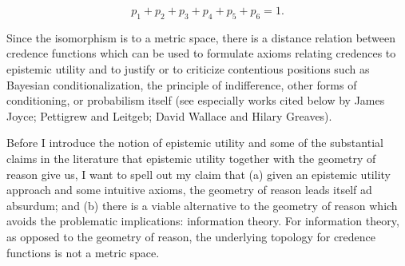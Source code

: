 \documentclass[11pt]{article}
\begin{document}
\begin{equation}
  \label{eq:simplex}
  p_{1}+p_{2}+p_{3}+p_{4}+p_{5}+p_{6}=1.
\end{equation}

Since the isomorphism is to a metric space, there is a distance
relation between credence functions which can be used to formulate
axioms relating credences to epistemic utility and to justify or to
criticize contentious positions such as Bayesian conditionalization,
the principle of indifference, other forms of conditioning, or
probabilism itself (see especially works cited below by James Joyce;
Pettigrew and Leitgeb; David Wallace and Hilary Greaves). 

Before I introduce the notion of epistemic utility and some of the
substantial claims in the literature that epistemic utility together
with the geometry of reason give us, I want to spell out my claim that
(a) given an epistemic utility approach and some intuitive axioms, the
geometry of reason leads itself ad absurdum; and (b) there is a viable
alternative to the geometry of reason which avoids the problematic
implications: information theory. For information theory, as opposed
to the geometry of reason, the underlying topology for credence
functions is not a metric space. 
\end{document}
